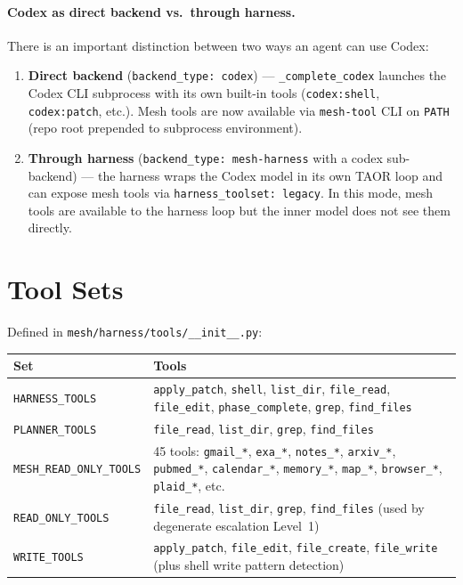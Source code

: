 \documentclass[11pt,letterpaper]{report}
\newcommand{\code}[1]{\texttt{#1}}
\begin{document}
\paragraph{Codex as direct backend vs.\ through harness.}
There is an important distinction between two ways an agent can use
Codex:
\begin{enumerate}[nosep]
  \item \textbf{Direct backend} (\code{backend\_type: codex}) ---
        \code{\_complete\_codex} launches the Codex CLI subprocess with
        its own built-in tools (\code{codex:shell}, \code{codex:patch},
        etc.).  Mesh tools are now available via \code{mesh-tool} CLI
        on \code{PATH} (repo root prepended to subprocess environment).
  \item \textbf{Through harness} (\code{backend\_type: mesh-harness}
        with a codex sub-backend) --- the harness wraps the Codex model
        in its own TAOR loop and can expose mesh tools via
        \code{harness\_toolset: legacy}.  In this mode, mesh tools are
        available to the harness loop but the inner model does not see
        them directly.
\end{enumerate}

\section{Tool Sets}
\label{sec:tool-sets}

Defined in \code{mesh/harness/tools/\_\_init\_\_.py}:

\begin{table}[h]
\centering
\begin{tabular}{@{}lp{9cm}@{}}
\toprule
Set & Tools \\
\midrule
\code{HARNESS\_TOOLS} &
  \code{apply\_patch}, \code{shell}, \code{list\_dir},
  \code{file\_read}, \code{file\_edit}, \code{phase\_complete},
  \code{grep}, \code{find\_files} \\
\code{PLANNER\_TOOLS} &
  \code{file\_read}, \code{list\_dir}, \code{grep},
  \code{find\_files} \\
\code{MESH\_READ\_ONLY\_TOOLS} &
  45 tools: \code{gmail\_*}, \code{exa\_*}, \code{notes\_*},
  \code{arxiv\_*}, \code{pubmed\_*}, \code{calendar\_*},
  \code{memory\_*}, \code{map\_*}, \code{browser\_*},
  \code{plaid\_*}, etc. \\
\code{READ\_ONLY\_TOOLS} &
  \code{file\_read}, \code{list\_dir}, \code{grep},
  \code{find\_files} (used by degenerate escalation Level~1) \\
\code{WRITE\_TOOLS} &
  \code{apply\_patch}, \code{file\_edit}, \code{file\_create},
  \code{file\_write} (plus shell write pattern detection) \\
\bottomrule
\end{tabular}
\end{table}
\end{document}
